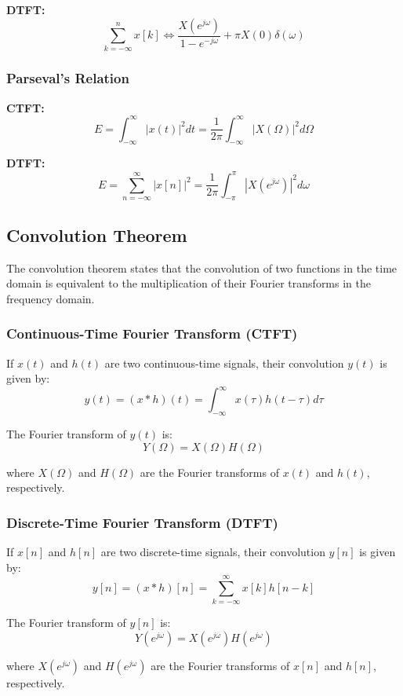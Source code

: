 \documentclass[12pt]{article}
\begin{document}
\textbf{DTFT:}
\[
\sum_{k=-\infty}^{n} x[k] \iff \frac{X(e^{j\omega})}{1 - e^{-j\omega}} + \pi X(0) \delta(\omega)
\]

\subsubsection{Parseval's Relation}

\textbf{CTFT:}
\[
E = \int_{-\infty}^{\infty} |x(t)|^2 dt = \frac{1}{2\pi} \int_{-\infty}^{\infty} |X(\Omega)|^2 d\Omega
\]

\textbf{DTFT:}
\[
E = \sum_{n=-\infty}^{\infty} |x[n]|^2 = \frac{1}{2\pi} \int_{-\pi}^{\pi} |X(e^{j\omega})|^2 d\omega
\]
\subsection{Convolution Theorem}

The convolution theorem states that the convolution of two functions in the time domain is equivalent to the multiplication of their Fourier transforms in the frequency domain.

\subsubsection{Continuous-Time Fourier Transform (CTFT)}

If \( x(t) \) and \( h(t) \) are two continuous-time signals, their convolution \( y(t) \) is given by:
\[
y(t) = (x * h)(t) = \int_{-\infty}^{\infty} x(\tau) h(t - \tau) d\tau
\]

The Fourier transform of \( y(t) \) is:
\[
Y(\Omega) = X(\Omega) H(\Omega)
\]

where \( X(\Omega) \) and \( H(\Omega) \) are the Fourier transforms of \( x(t) \) and \( h(t) \), respectively.

\subsubsection{Discrete-Time Fourier Transform (DTFT)}

If \( x[n] \) and \( h[n] \) are two discrete-time signals, their convolution \( y[n] \) is given by:
\[
y[n] = (x * h)[n] = \sum_{k=-\infty}^{\infty} x[k] h[n - k]
\]

The Fourier transform of \( y[n] \) is:
\[
Y(e^{j\omega}) = X(e^{j\omega}) H(e^{j\omega})
\]

where \( X(e^{j\omega}) \) and \( H(e^{j\omega}) \) are the Fourier transforms of \( x[n] \) and \( h[n] \), respectively.
\end{document}
